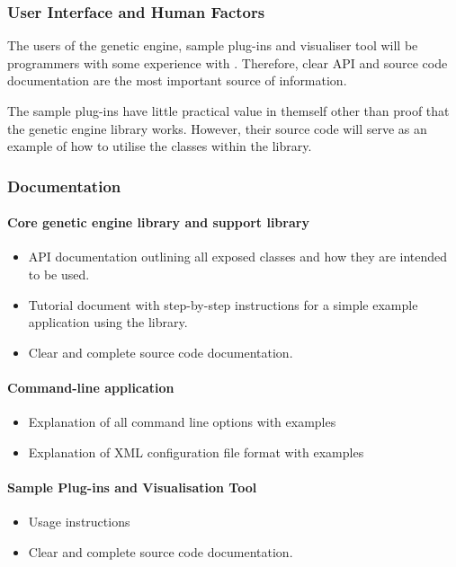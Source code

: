 \subsubsection{User Interface and Human Factors}
The users of the genetic engine, sample plug-ins and visualiser tool will be programmers with some experience with \csharp. Therefore, clear API and source code documentation are the most important source of information.

The sample plug-ins have little practical value in themself other than proof that the genetic engine library works. However, their source code will serve as an example of how to utilise the classes within the library.

\subsubsection{Documentation}
\paragraph{Core genetic engine library and support library}
\begin{itemize}
 \item API documentation outlining all exposed classes and how they are intended to be used.
 \item Tutorial document with step-by-step instructions for a simple example application using the library.
 \item Clear and complete source code documentation.
\end{itemize}

\paragraph{Command-line application}
\begin{itemize}
 \item Explanation of all command line options with examples
 \item Explanation of XML configuration file format with examples
\end{itemize}

\paragraph{Sample Plug-ins and Visualisation Tool}
\begin{itemize}
 \item Usage instructions
 \item Clear and complete source code documentation.
\end{itemize}


